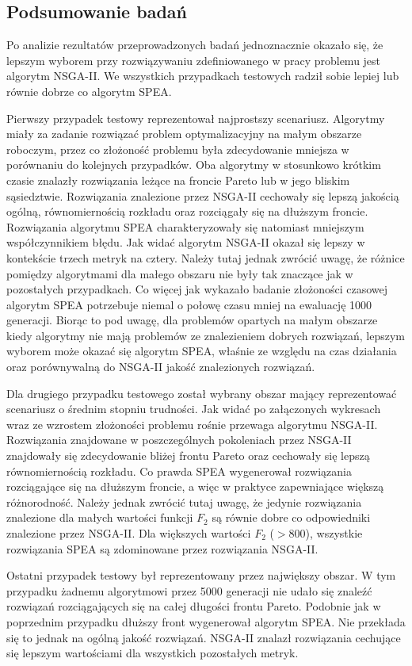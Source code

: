 \documentclass[twoside]{iisthesis}
\begin{document}
\subsection{Podsumowanie badań}
Po analizie rezultatów przeprowadzonych badań jednoznacznie okazało się, że lepszym wyborem przy rozwiązywaniu zdefiniowanego w pracy problemu jest algorytm NSGA-II. We wszystkich przypadkach testowych radził sobie lepiej lub równie dobrze co algorytm SPEA.

Pierwszy przypadek testowy reprezentował najprostszy scenariusz. Algorytmy miały za zadanie rozwiązać problem optymalizacyjny na małym obszarze roboczym, przez co złożoność problemu była zdecydowanie mniejsza w porównaniu do kolejnych przypadków. Oba algorytmy w stosunkowo krótkim czasie znalazły rozwiązania leżące na froncie Pareto lub w jego bliskim sąsiedztwie. Rozwiązania znalezione przez NSGA-II cechowały się lepszą jakością ogólną, równomiernością rozkładu oraz rozciągały się na dłuższym froncie. Rozwiązania algorytmu SPEA charakteryzowały się natomiast mniejszym współczynnikiem błędu. Jak widać algorytm NSGA-II okazał się lepszy w kontekście trzech metryk na cztery. Należy tutaj jednak zwrócić uwagę, że różnice pomiędzy algorytmami dla małego obszaru nie były tak znaczące jak w pozostałych przypadkach. Co więcej jak wykazało badanie złożoności czasowej algorytm SPEA potrzebuje niemal o połowę czasu mniej na ewaluację 1000 generacji. Biorąc to pod uwagę, dla problemów opartych na małym obszarze kiedy algorytmy nie mają problemów ze znalezieniem dobrych rozwiązań, lepszym wyborem może okazać się algorytm SPEA, właśnie ze względu na czas działania oraz porównywalną do NSGA-II jakość znalezionych rozwiązań.

Dla drugiego przypadku testowego został wybrany obszar mający reprezentować scenariusz o średnim stopniu trudności. Jak widać po załączonych wykresach wraz ze wzrostem złożoności problemu rośnie przewaga algorytmu NSGA-II. Rozwiązania znajdowane w poszczególnych pokoleniach przez NSGA-II znajdowały się zdecydowanie bliżej frontu Pareto oraz cechowały się lepszą równomiernością rozkładu. Co prawda SPEA wygenerował rozwiązania rozciągające się na dłuższym froncie, a więc w praktyce zapewniające większą różnorodność. Należy jednak zwrócić tutaj uwagę, że jedynie rozwiązania znalezione dla małych wartości funkcji $F_{2}$ są równie dobre co odpowiedniki znalezione przez NSGA-II. Dla większych wartości $F_{2}$ ($> 800$), wszystkie rozwiązania SPEA są zdominowane przez rozwiązania NSGA-II.

Ostatni przypadek testowy był reprezentowany przez największy obszar. W tym przypadku żadnemu algorytmowi przez 5000 generacji nie udało się znaleźć rozwiązań rozciągających się na całej długości frontu Pareto. Podobnie jak w poprzednim przypadku dłuższy front wygenerował algorytm SPEA. Nie przekłada się to jednak na ogólną jakość rozwiązań. NSGA-II znalazł rozwiązania cechujące się lepszym wartościami dla wszystkich pozostałych metryk.
\end{document}

